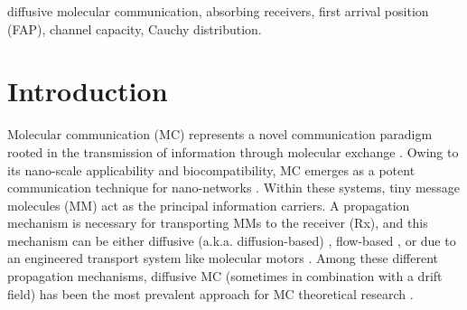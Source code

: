 \documentclass[conference]{IEEEtran}
\theoremstyle{definition}
\theoremstyle{plain}
\begin{document}
\begin{abstract}

\end{abstract}

\begin{IEEEkeywords}
diffusive molecular communication, absorbing receivers, first arrival position (FAP), channel capacity, Cauchy distribution.
\end{IEEEkeywords}

\section{Introduction}
\color{black}
Molecular communication (MC) represents a novel communication paradigm rooted in the transmission of information through molecular exchange \cite{nakano2013molecular,yeh2012new}. Owing to its nano-scale applicability and biocompatibility, MC emerges as a potent communication technique for nano-networks \cite{akyildiz2008nanonetworks,farsad2016comprehensive}. Within these systems, tiny message molecules (MM) act as the principal information carriers. A propagation mechanism is necessary for transporting MMs to the receiver (Rx), and this mechanism can be either diffusive (a.k.a. diffusion-based) \cite{pierobon2012capacity}, flow-based \cite{kadloor2012molecular}, or due to an engineered transport system like molecular motors \cite{moore2006design,gregori2010new}. Among these different propagation mechanisms, diffusive MC (sometimes in combination with a drift field) has been the most prevalent approach for MC theoretical research \cite{jamali2019channel}.
\color{black}
\end{document}
